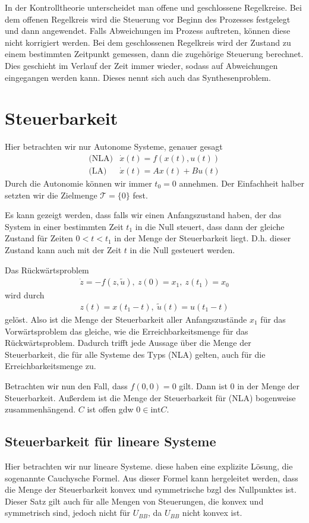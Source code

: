 \documentclass[pdftex,a4paper,oneside]{scrbook}
\begin{document}
	In der Kontrolltheorie unterscheidet man offene und geschlossene Regelkreise. Bei dem offenen Regelkreis wird die Steuerung vor Beginn des Prozesses festgelegt und dann angewendet. Falls Abweichungen im Prozess auftreten, können diese nicht korrigiert werden. Bei dem geschlossenen Regelkreis wird der Zustand zu einem bestimmten Zeitpunkt gemessen, dann die zugehörige Steuerung berechnet. Dies geschieht im Verlauf der Zeit immer wieder, sodass auf Abweichungen eingegangen werden kann. Dieses nennt sich auch das Synthesenproblem.
	
	\section{Steuerbarkeit}
	Hier betrachten wir nur Autonome Systeme, genauer gesagt
	\begin{align*}
	\text{(NLA)}& \dot{x}(t) = f(x(t), u(t)) \\
	\text{(LA)} & \dot{x}(t) = A x(t) + B u(t)
	\end{align*}
	Durch die Autonomie können wir immer $t_0=0$ annehmen. Der Einfachheit halber setzten wir die Zielmenge $ \mathcal{T} = \{0 \}$ fest. 
	
	Es kann gezeigt werden, dass falls wir einen Anfangszustand haben, der das System in einer bestimmten Zeit $t_1$ in die Null steuert, dass dann der gleiche Zustand für Zeiten $0<t<t_1$ in der Menge der Steuerbarkeit liegt. D.h. dieser Zustand kann auch mit der Zeit $t$ in die Null gesteuert werden. 
	
	Das Rückwärtsproblem
	\begin{align*}
	\dot{z} = - f(z,\widetilde{u}), \: z(0)=x_1, \: z(t_1)= x_0
	\end{align*}
	wird durch 
	\begin{align*}
	z(t)= x(t_1 - t), \: \widetilde{u}(t) = u(t_1-t)
	\end{align*}
	gelöst. Also ist die Menge der Steuerbarkeit aller Anfangszustände $x_1$ für das Vorwärtsproblem das gleiche, wie die Erreichbarkeitsmenge für das Rückwärtsproblem. Dadurch trifft jede Aussage über die Menge der Steuerbarkeit, die für alle Systeme des Typs (NLA) gelten, auch für die Erreichbarkeitsmenge zu.
	
	Betrachten wir nun den Fall, dass $f(0,0)=0$ gilt. Dann ist $0$ in der Menge der Steuerbarkeit. Außerdem ist die Menge der Steuerbarkeit für (NLA) bogenweise zusammenhängend. $C$ ist offen gdw $0 \in \text{int} C$. 
	
	\subsection{Steuerbarkeit für lineare Systeme}
	Hier betrachten wir nur lineare Systeme. diese haben eine explizite Lösung, die sogenannte Cauchysche Formel. Aus dieser Formel kann hergeleitet werden, dass die Menge der Steuerbarkeit konvex und symmetrische bzgl des Nullpunktes ist. Dieser Satz gilt auch für alle Mengen von Steuerungen, die konvex und symmetrisch sind, jedoch nicht für $U_{BB}$, da $U_{BB}$ nicht konvex ist. 
	
\end{document}
